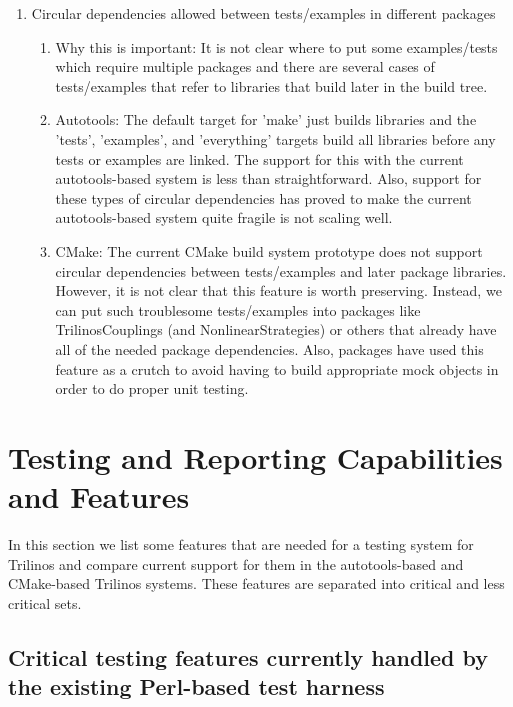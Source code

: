 \documentclass[pdf,ps2pdf,11pt]{SANDreport}
\begin{document}
\begin{enumerate}
\begin{enumerate}
  \end{enumerate}

{}\item Circular dependencies allowed between tests/examples in
different packages

  \begin{enumerate}

  {}\item Why this is important: It is not clear where to put some
  examples/tests which require multiple packages and there are
  several cases of tests/examples that refer to libraries that build
  later in the build tree.

  {}\item Autotools: The default target for 'make' just builds
  libraries and the 'tests', 'examples', and 'everything' targets
  build all libraries before any tests or examples are linked.  The
  support for this with the current autotools-based system is less than
  straightforward.  Also, support for these types of circular
  dependencies has proved to make the current autotools-based system
  quite fragile is not scaling well.

  {}\item CMake: The current CMake build system prototype does not
  support circular dependencies between tests/examples and later package
  libraries.  However, it is not clear that this feature is worth
  preserving.  Instead, we can put such troublesome tests/examples
  into packages like TrilinosCouplings (and NonlinearStrategies) or
  others that already have all of the needed package dependencies.
  Also, packages have used this feature as a crutch to avoid having to
  build appropriate mock objects in order to do proper unit testing.

  \end{enumerate}

\end{enumerate}


%
\section{Testing and Reporting Capabilities and Features}
%

In this section we list some features that are needed for a testing
system for Trilinos and compare current support for them in the
autotools-based and CMake-based Trilinos systems.  These features are
separated into critical and less critical sets.


%
{}\subsection{Critical testing features currently handled by the
existing Perl-based test harness}
%
\end{document}
